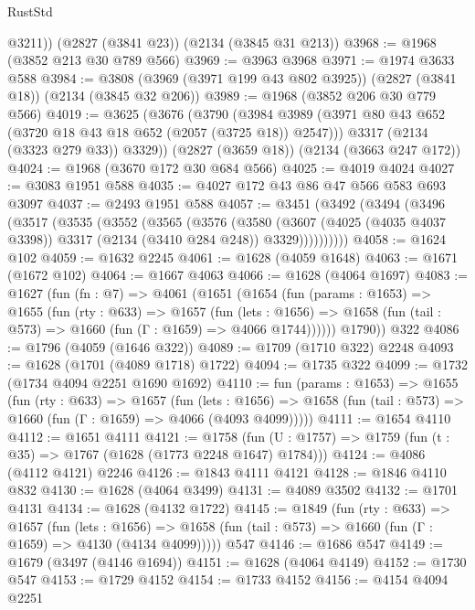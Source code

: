 \begin{lexlean}{RustStd}
\begin{coremodule}
        @3211))
    (@2827 (@3841 @23))
    (@2134 (@3845 @31 @213))
@3968 := @1968 (@3852 @213 @30 @789 @566)
@3969 := @3963 @3968
@3971 := @1974 @3633 @588
@3984 := @3808 (@3969 (@3971 @199 @43 @802 @3925)) (@2827 (@3841 @18)) (@2134 (@3845 @32 @206))
@3989 := @1968 (@3852 @206 @30 @779 @566)
@4019 := @3625
    (@3676
      (@3790
        (@3984 @3989 (@3971 @80 @43 @652 (@3720 @18 @43 @18 @652 (@2057 (@3725 @18)) @2547)))
        @3317
        (@2134 (@3323 @279 @33))
        @3329))
    (@2827 (@3659 @18))
    (@2134 (@3663 @247 @172))
@4024 := @1968 (@3670 @172 @30 @684 @566)
@4025 := @4019 @4024
@4027 := @3083 @1951 @588
@4035 := @4027 @172 @43 @86 @47 @566 @583 @693 @3097
@4037 := @2493 @1951 @588
@4057 := @3451
    (@3492
      (@3494
        (@3496
          (@3517
            (@3535
              (@3552
                (@3565
                  (@3576
                    (@3580
                      (@3607
                        (@4025 (@4035 @4037 @3398))
                        @3317
                        (@2134 (@3410 @284 @248))
                        @3329))))))))))
@4058 := @1624 @102
@4059 := @1632 @2245
@4061 := @1628 (@4059 @1648)
@4063 := @1671 (@1672 @102)
@4064 := @1667 @4063
@4066 := @1628 (@4064 @1697)
@4083 := @1627
    (fun (fn : @7) =>
    @4061
      (@1651
        (@1654
          (fun (params : @1653) =>
          @1655
            (fun (rty : @633) =>
            @1657
              (fun (lets : @1656) =>
              @1658 (fun (tail : @573) => @1660 (fun (Γ : @1659) => @4066 @1744))))))
        @1790))
    @322
@4086 := @1796 (@4059 (@1646 @322))
@4089 := @1709 (@1710 @322) @2248
@4093 := @1628 (@1701 (@4089 @1718) @1722)
@4094 := @1735 @322
@4099 := @1732 (@1734 @4094 @2251 @1690 @1692)
@4110 := fun (params : @1653) =>
  @1655
    (fun (rty : @633) =>
    @1657
      (fun (lets : @1656) =>
      @1658 (fun (tail : @573) => @1660 (fun (Γ : @1659) => @4066 (@4093 @4099)))))
@4111 := @1654 @4110
@4112 := @1651 @4111
@4121 := @1758 (fun (U : @1757) => @1759 (fun (t : @35) => @1767 (@1628 (@1773 @2248 @1647) @1784)))
@4124 := @4086 (@4112 @4121) @2246
@4126 := @1843 @4111 @4121
@4128 := @1846 @4110 @832
@4130 := @1628 (@4064 @3499)
@4131 := @4089 @3502
@4132 := @1701 @4131
@4134 := @1628 (@4132 @1722)
@4145 := @1849
    (fun (rty : @633) =>
    @1657
      (fun (lets : @1656) =>
      @1658 (fun (tail : @573) => @1660 (fun (Γ : @1659) => @4130 (@4134 @4099)))))
    @547
@4146 := @1686 @547
@4149 := @1679 (@3497 (@4146 @1694))
@4151 := @1628 (@4064 @4149)
@4152 := @1730 @547
@4153 := @1729 @4152
@4154 := @1733 @4152
@4156 := @4154 @4094 @2251

\end{coremodule}
\end{lexlean}
